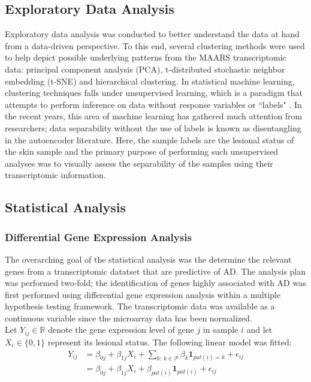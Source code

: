 \documentclass[journal, a4paper]{IEEEtran}
\def\one{\mathbf{1}}
\begin{document}
\subsection{Exploratory Data Analysis}

Exploratory data analysis was conducted to better understand the data at hand from a data-driven perspective. To this end, several clustering methods were used to help depict possible underlying patterns from the MAARS transcriptomic data: principal component analysis (PCA), t-distributed stochastic neighbor embedding (t-SNE) and hierarchical clustering\cite{maaten2008visualizing}\cite{friedman2001elements}. In statistical machine learning, clustering techniques falls under unsupervised learning, which is a paradigm that attempts to perform inference on data without response variables or ``labels" \cite{friedman2001elements}. In the recent years, this area of machine learning has gathered much attention from researchers; data separability without the use of labels is known as disentangling in the autoencoder literature\cite{higgins2017beta}\cite{burgess2018understanding}. Here, the sample labels are the lesional status of the skin sample and the primary purpose of performing such unsupervised analyses was to visually assess the separability of the samples using their transcriptomic information.

\subsection{Statistical Analysis}

\subsubsection{Differential Gene Expression Analysis}

The overarching goal of the statistical analysis was the determine the relevant genes from a transcriptomic datatset that are predictive of AD. The analysis plan was performed two-fold; the identification of genes highly associated with AD was first performed using differential gene expression analysis within a multiple hypothesis testing framework. The transcriptomic data was available as a continuous variable since the microarray data has been normalized.\\

Let $Y_{ij} \in \mathbb{R}$ denote the gene expression level of gene $j$ in sample $i$ and let $X_i \in \{0, 1\}$ represent its lesional status. The following linear model was fitted:
\begin{align*}
  Y_{ij} &= \beta_{0j} + \beta_{1j}X_i + \sum_{k:\,k\in\mathcal{P}}\beta_{k}\one_{pat(i) = k} + \epsilon_{ij}\\
  &=\beta_{0j} + \beta_{1j}X_i + \beta_{pat(i)}\one_{pat(i)} + \epsilon_{ij}
\end{align*}
\end{document}
